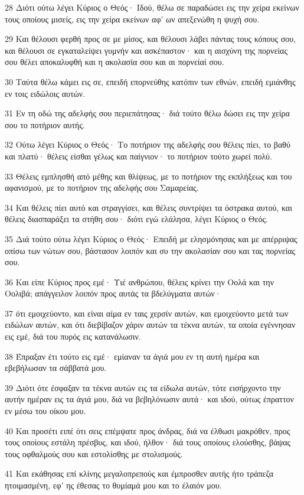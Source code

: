 \par 28 Διότι ούτω λέγει Κύριος ο Θεός· Ιδού, θέλω σε παραδώσει εις την χείρα εκείνων τους οποίους μισείς, εις την χείρα εκείνων αφ' ων απεξενώθη η ψυχή σου.
\par 29 Και θέλουσι φερθή προς σε με μίσος, και θέλουσι λάβει πάντας τους κόπους σου, και θέλουσι σε εγκαταλείψει γυμνήν και ασκέπαστον· και η αισχύνη της πορνείας σου θέλει αποκαλυφθή και η ακολασία σου και αι πορνείαί σου.
\par 30 Ταύτα θέλω κάμει εις σε, επειδή επορνεύθης κατόπιν των εθνών, επειδή εμιάνθης εν τοις ειδώλοις αυτών.
\par 31 Εν τη οδώ της αδελφής σου περιεπάτησας· διά τούτο θέλω δώσει εις την χείρα σου το ποτήριον αυτής.
\par 32 Ούτω λέγει Κύριος ο Θεός· Το ποτήριον της αδελφής σου θέλεις πίει, το βαθύ και πλατύ· θέλεις είσθαι γέλως και παίγνιον· το ποτήριον τούτο χωρεί πολύ.
\par 33 Θέλεις εμπλησθή από μέθης και θλίψεως, με το ποτήριον της εκπλήξεως και του αφανισμού, με το ποτήριον της αδελφής σου Σαμαρείας.
\par 34 Και θέλεις πίει αυτό και στραγγίσει, και θέλεις συντρίψει τα όστρακα αυτού, και θέλεις διασπαράξει τα στήθη σου· διότι εγώ ελάλησα, λέγει Κύριος ο Θεός.
\par 35 Διά τούτο ούτω λέγει Κύριος ο Θεός· Επειδή με ελησμόνησας και με απέρριψας οπίσω των νώτων σου, βάστασον λοιπόν και συ την ακολασίαν σου και τας πορνείας σου.
\par 36 Και είπε Κύριος προς εμέ· Υιέ ανθρώπου, θέλεις κρίνει την Οολά και την Οολιβά; απάγγειλον λοιπόν προς αυτάς τα βδελύγματα αυτών·
\par 37 ότι εμοιχεύοντο, και είναι αίμα εν ταις χερσίν αυτών, και εμοιχεύοντο μετά των ειδώλων αυτών, και ότι διεβίβαζον χάριν αυτών τα τέκνα αυτών, τα οποία εγέννησαν εις εμέ, διά του πυρός εις κατανάλωσιν.
\par 38 Έπραξαν έτι τούτο εις εμέ· εμίαναν τα άγιά μου εν τη αυτή ημέρα και εβεβήλωσαν τα σάββατά μου.
\par 39 Διότι ότε έσφαξαν τα τέκνα αυτών εις τα είδωλα αυτών, τότε εισήρχοντο την αυτήν ημέραν εις τα άγιά μου, διά να βεβηλόνωσιν αυτά· και ιδού, ούτως έπραττον εν μέσω του οίκου μου.
\par 40 Και προσέτι ειπέ ότι σεις επέμψατε προς άνδρας, διά να έλθωσι μακρόθεν, προς τους οποίους εστάλη πρέσβυς, και ιδού, ήλθον· διά τους οποίους ελούσθης, βάψας τους οφθαλμούς σου και εστολίσθης με στολισμούς.
\par 41 Και εκάθησας επί κλίνης μεγαλοπρεπούς και έμπροσθεν αυτής ήτο τράπεζα ητοιμασμένη, εφ' ης έθεσας το θυμίαμά μου και το έλαιόν μου.

